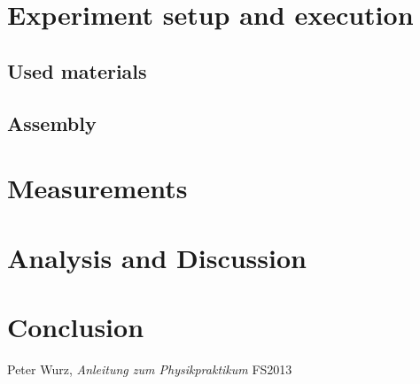 \documentclass{scrreprt}
\begin{document}
\section{Experiment setup and execution}

\subsection{Used materials}

\subsection{Assembly}

\section{Measurements}

\section{Analysis and Discussion}

\section{Conclusion}

\begin{thebibliography}{9}

  Peter Wurz,
  \emph{Anleitung zum Physikpraktikum}
  FS2013

\end{thebibliography}
\end{document}
